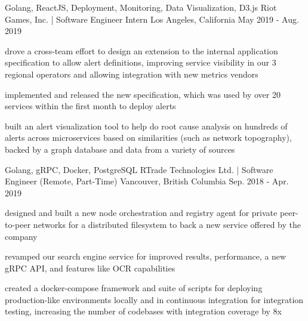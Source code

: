 

\begin{cventries}

  \cventry
    {Golang, ReactJS, Deployment, Monitoring, Data Visualization, D3.js} %
    {Riot Games, Inc. | Software Engineer Intern} %
    {Los Angeles, California} %
    {May 2019 - Aug. 2019} %
    {
      \begin{cvitems} %
        \item {drove a cross-team effort to design an extension to the internal application specification to allow alert definitions, improving service visibility in our 3 regional operators and allowing integration with new metrics vendors}
        \item{implemented and released the new specification, which was used by over 20 services within the first month to deploy alerts}
        \item {built an alert visualization tool to help do root cause analysis on hundreds of alerts across microservices based on similarities (such as network topography), backed by a graph database and data from a variety of sources}
      \end{cvitems}
    }

  \cventry
    {Golang, gRPC, Docker, PostgreSQL} %
    {RTrade Technologies Ltd. | Software Engineer (Remote, Part-Time)} %
    {Vancouver, British Columbia} %
    {Sep. 2018 - Apr. 2019} %
    {
      \begin{cvitems} %
        \item {designed and built a new node orchestration and registry agent for private  peer-to-peer networks for a distributed filesystem to back a new service offered by the company}
        \item {revamped our search engine service for improved results, performance, a new gRPC API, and features like OCR capabilities}
        \item {created a docker-compose framework and suite of scripts for deploying production-like environments locally and in continuous integration for integration testing, increasing the number of codebases with integration coverage by 8x}
      \end{cvitems}
    }


\end{cventries}
